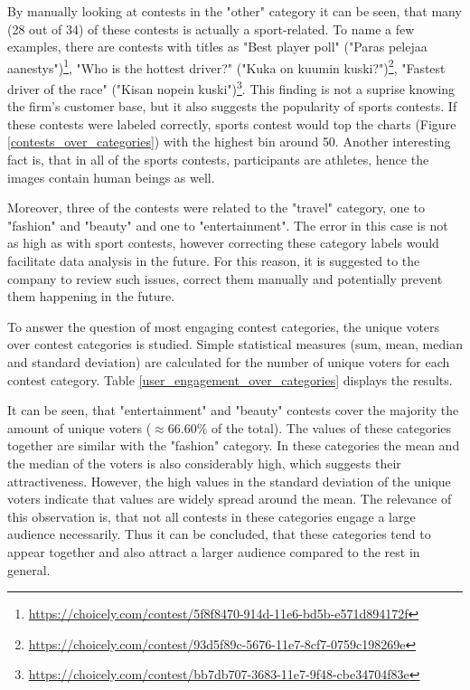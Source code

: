     By manually looking at contests in the "other" category it can be seen, that many (28 out of 34) of these contests is actually a sport-related. To name a few examples, there are contests with titles as "Best player poll" ("Paras pelejaa aanestys")\footnote{\url{https://choicely.com/contest/5f8f8470-914d-11e6-bd5b-e571d894172f}}, "Who is the hottest driver?" ("Kuka on kuumin kuski?")\footnote{\url{https://choicely.com/contest/93d5f89c-5676-11e7-8cf7-0759c198269e}}, "Fastest driver of the race" ("Kisan nopein kuski")\footnote{\url{https://choicely.com/contest/bb7db707-3683-11e7-9f48-cbe34704f83e}}. This finding is not a suprise knowing the firm's customer base, but it also suggests the popularity of sports contests. If these contests were labeled correctly, sports contest would top the charts (Figure \ref{contests_over_categories}) with the highest bin around 50. Another interesting fact is, that in all of the sports contests, participants are athletes, hence the images contain human beings as well. 
    
    Moreover, three of the contests were related to the "travel" category, one to "fashion" and "beauty" and one to "entertainment". The error in this case is not as high as with sport contests, however correcting these category labels would facilitate data analysis in the future. For this reason, it is suggested to the company to review such issues, correct them manually and potentially prevent them happening in the future. 
    
    To answer the question of most engaging contest categories, the unique voters over contest categories is studied. Simple statistical measures (sum, mean, median and standard deviation) are calculated for the number of unique voters for each contest category. Table \ref{user_engagement_over_categories} displays the results.
    
    It can be seen, that "entertainment" and "beauty" contests cover the majority the amount of unique voters ($\approx 66.60 \%$ of the total). The values of these categories together are similar with the  "fashion" category. In these categories the mean and the median of the voters is also considerably high, which suggests their attractiveness. However, the high values in the standard deviation of the unique voters indicate that values are widely spread around the mean. The relevance of this observation is, that not all contests in these categories engage a large audience necessarily. Thus it can be concluded, that these categories tend to appear together and also attract a larger audience compared to the rest in general. 

